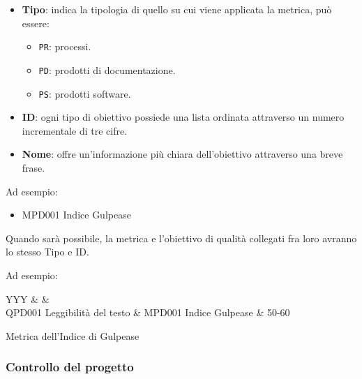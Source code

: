 			\begin{itemize}
				\item \textbf{Tipo}: indica la tipologia di quello su cui viene applicata la metrica, può essere:
				\begin{itemize}
					\item \texttt{PR}: processi.
					\item \texttt{PD}: prodotti di documentazione.
					\item \texttt{PS}: prodotti software.
				\end{itemize}

				\item \textbf{ID}: ogni tipo di obiettivo possiede una lista ordinata attraverso un numero incrementale di tre cifre.
				\item \textbf{Nome}: offre un'informazione più chiara dell'obiettivo attraverso una breve frase.
			\end{itemize}

			Ad esempio:

			\begin{itemize}
				\item MPD001 Indice Gulpease
			\end{itemize}

			Quando sarà possibile, la metrica e l'obiettivo di qualità collegati fra loro avranno lo stesso Tipo e ID.

			Ad esempio:

			\begin{table}[H]
				\begin{detailtable}{\textwidth}{YYY}
					 &
					 &
					\\\toprule
					QPD001 Leggibilità del testo & MPD001 Indice Gulpease & 50-60\\
				\end{detailtable}
				\caption[Metrica Indice di Gulpease]{Metrica dell'Indice di Gulpease}%
			\end{table}


		\subsubsection{Controllo del progetto}

